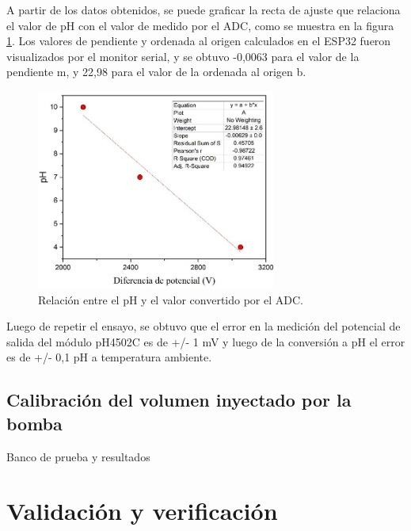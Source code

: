 A partir de los datos obtenidos, se puede graficar la recta de ajuste que relaciona el valor de pH con el valor de medido por el ADC, como se muestra en la figura \ref{fig:rectaADC}. Los valores de pendiente y ordenada al origen calculados en el ESP32 fueron visualizados por el monitor serial, y se obtuvo -0,0063 para el valor de la pendiente m, y 22,98 para el valor de la ordenada al origen b. 

\begin{figure}[htbp]
	\centering
	\includegraphics[width=0.7\textwidth]{./Figures/rectaADC.jpg}
	\caption{Relación entre el pH y el valor convertido por el ADC.}
	\label{fig:rectaADC}
\end{figure}

Luego de repetir el ensayo, se obtuvo que el error en la medición del potencial de salida del módulo pH4502C es de +/- 1 mV y luego de la conversión a pH el error es de +/- 0,1 pH a temperatura ambiente. 

\subsection{Calibración del volumen inyectado por la bomba}

Banco de prueba y resultados


\section{Validación y verificación}
\label{sec:validacionVerificacion}